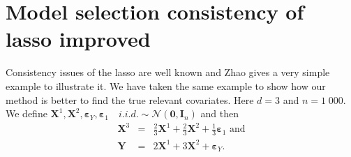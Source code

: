 \documentclass[12pt,a4paper]{report}
\begin{document}
%			
			
	\section{Model selection consistency of {\sc lasso} improved}\label{consistency}
		Consistency issues of the {\sc lasso} are well known and Zhao \cite{Zhao2006MSC} gives a very simple example to illustrate it.
		We have taken the same example to show how our method is better to find the true relevant covariates.
		Here $d=3$ and $n=1\;000$.\\
		We define $\boldsymbol{X}^1,\boldsymbol{X}^2, \boldsymbol{\varepsilon}_Y, \boldsymbol{\varepsilon}_{1} \quad i.i.d. \sim \mathcal{N}(\boldsymbol{0},\boldsymbol{I}_n)$ and then \\
		\begin{eqnarray}
		\boldsymbol{X}^3%
		&=&\frac{2}{3}\boldsymbol{X}^1+\frac{2}{3}\boldsymbol{X}^2+\frac{1}{3}\boldsymbol{\varepsilon}_1 \textrm{ and}  \nonumber \\
		\boldsymbol{Y}%
		&=&2\boldsymbol{X}^1+3\boldsymbol{X}^2+\boldsymbol{\varepsilon}_Y. \nonumber 
		\end{eqnarray}
		
\end{document}
